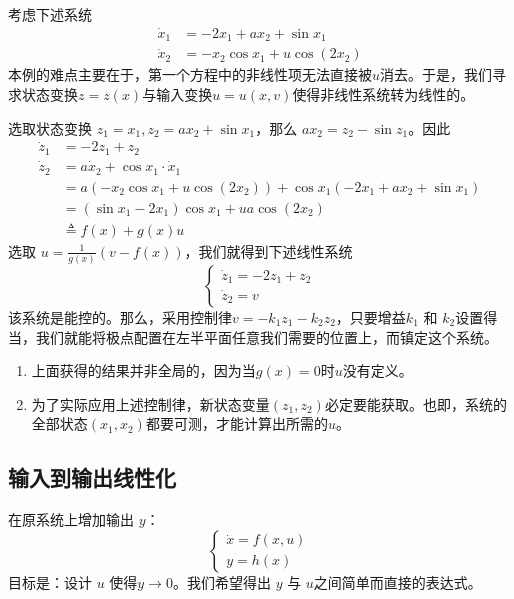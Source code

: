 \begin{example}[更一般的例子]
  考虑下述系统
  \begin{align*}
    \dot{x}_1 & = - 2 x_1 + a  x_2 + \sin  x_1\\
    \dot{x}_2 & = - x_2 \cos  x_1 + u  \cos (2 x_2)
  \end{align*}
  本例的难点主要在于，第一个方程中的非线性项无法直接被$u$消去。于是，我们寻求状态变换$z = z (x)$与输入变换$u = u (x, v)$使得非线性系统转为线性的。
  
  选取状态变换 $z_1 = x_1, z_2 = a  x_2 + \sin  x_1$，那么 $a  x_2 = z_2 -\sin  z_1$。因此
  \begin{align*}
    \dot{z}_1 & = - 2 z_1 + z_2\\
    \dot{z}_2 & = a  \dot{x}_2 + \cos  x_1 \cdot \dot{x}_1\\
    & = a  (- x_2 \cos  x_1 + u  \cos (2 x_2)) + \cos  x_1 (- 2 x_1 + a 
    x_2 + \sin  x_1)\\
    & = (\sin  x_1 - 2 x_1) \cos  x_1 + u  a   \cos (2 x_2)\\
    & \triangleq f(x)+g(x)u
  \end{align*}
  选取 $u = \frac{1}{g(x)} (v - f(x))$，我们就得到下述线性系统
  \[ \left\{\begin{array}{l}
       \dot{z}_1 = - 2 z_1 + z_2\\
       \dot{z}_2 = v
     \end{array}\right. \]
  该系统是能控的。那么，采用控制律$v = - k_1 z_1 - k_2 z_2$，只要增益$k_1$ 和 $k_2$设置得当，我们就能将极点配置在左半平面任意我们需要的位置上，而镇定这个系统。
  
  \begin{remark}   
    \begin{enumerate}[leftmargin=2em]
      \item 上面获得的结果并非全局的，因为当$g(x)=0$时$u$没有定义。
      
      \item 为了实际应用上述控制律，新状态变量$(z_1,z_2)$必定要能获取。也即，系统的全部状态$(x_1, x_2)$都要可测，才能计算出所需的$u$。
    \end{enumerate}
  \end{remark}
\end{example}

\subsection{输入到输出线性化}

在原系统上增加输出 $y$：
\[ \left\{\begin{array}{l}
     \dot{x} = f (x, u)\\
     y = h (x)
   \end{array}\right. \]
目标是：设计 $u$ 使得$y \rightarrow 0$。我们希望得出 $y$ 与 $u$之间简单而直接的表达式。

